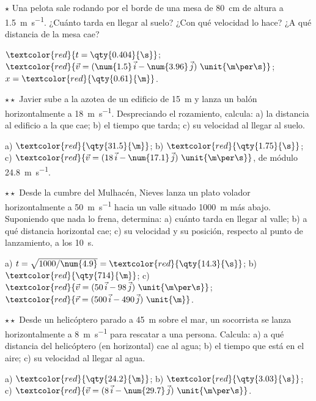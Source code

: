 \begin{exercise}
    \(\star\) Una pelota sale rodando por el borde de una mesa de \qty{80}{\cm} de altura a \qty{1.5}{\m\per\s}. ¿Cuánto tarda en
    llegar al suelo? ¿Con qué velocidad lo hace? ¿A qué distancia de la mesa cae?
    \begin{solu}
        \(\textcolor{red}{t = \qty{0.404}{\s}}\); \(\textcolor{red}{\vec v = (\num{1.5}\,\ivec - \num{3.96}\,\jvec)~\unit{\m\per\s}}\);
        \(x = \textcolor{red}{\qty{0.61}{\m}}\).
    \end{solu}
\end{exercise}

\begin{exercise}
    \(\star\star\) Javier sube a la azotea de un edificio de \qty{15}{\m} y lanza un balón horizontalmente a \qty{18}{\m\per\s}.
    Despreciando el rozamiento, calcula: a) la distancia al edificio a la que cae; b) el tiempo que tarda; c) su velocidad al llegar
    al suelo.
    \begin{solu}
        a) \(\textcolor{red}{\qty{31.5}{\m}}\); b) \(\textcolor{red}{\qty{1.75}{\s}}\); c) \(\textcolor{red}{\vec v = (18\,\ivec -
        \num{17.1}\,\jvec)~\unit{\m\per\s}}\), de módulo \qty{24.8}{\m\per\s}.
    \end{solu}
\end{exercise}

\begin{exercise}
    \(\star\star\) Desde la cumbre del Mulhacén, Nieves lanza un plato volador horizontalmente a \qty{50}{\m\per\s} hacia un valle
    situado \qty{1000}{\m} más abajo. Suponiendo que nada lo frena, determina: a) cuánto tarda en llegar al valle; b) a qué
    distancia horizontal cae; c) su velocidad y su posición, respecto al punto de lanzamiento, a los \qty{10}{\s}.
    \begin{solu}
        a) \(t = \sqrt{1000/\num{4.9}} = \textcolor{red}{\qty{14.3}{\s}}\); b) \(\textcolor{red}{\qty{714}{\m}}\);
        c) \(\textcolor{red}{\vec v = (50\,\ivec - 98\,\jvec)~\unit{\m\per\s}}\); \(\textcolor{red}{\vec r = (500\,\ivec - 490\,\jvec)~\unit{\m}}\).
    \end{solu}
\end{exercise}

\begin{exercise}
    \(\star\star\) Desde un helicóptero parado a \qty{45}{\m} sobre el mar, un socorrista se lanza horizontalmente a
    \qty{8}{\m\per\s} para rescatar a una persona. Calcula: a) a qué distancia del helicóptero (en horizontal) cae al agua; b) el
    tiempo que está en el aire; c) su velocidad al llegar al agua.
    \begin{solu}
        a) \(\textcolor{red}{\qty{24.2}{\m}}\); b) \(\textcolor{red}{\qty{3.03}{\s}}\); c) \(\textcolor{red}{\vec v = (8\,\ivec -
        \num{29.7}\,\jvec)~\unit{\m\per\s}}\).
    \end{solu}
\end{exercise}

